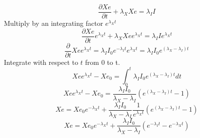 \documentclass[]{article}
\begin{document}
		\[
		\frac{\partial Xe}{\partial t}+ \lambda_X Xe = \lambda_I I 
		\]
		Multiply by an integrating factor $e^{\lambda_Xt}$
		\[
		\frac{\partial Xe}{\partial t}e^{\lambda_Xt} +\lambda_X Xe e^{\lambda_Xt}= \lambda_I I e^{\lambda_Xt} 
		\]
		\[
		\frac{\partial}{\partial t}Xe e^{\lambda_Xt}= \lambda_I I_0 e^{-\lambda_I t} e^{\lambda_Xt} = \lambda_I I_0 e^{(\lambda_X-\lambda_I )t} 
		\]
		Integrate with respect to $t$ from 0 to t. 
		\[
		Xe e^{\lambda_Xt}-Xe_0= \int_{0}^{t}\lambda_I I_0 e^{(\lambda_X-\lambda_I )t} dt
		\]
		\[
		Xe e^{\lambda_Xt}-Xe_0= \frac{\lambda_I I_0}{\lambda_X-\lambda_I} (e^{(\lambda_X-\lambda_I)t}-1)
		\]
		\[
		Xe =Xe_0 e^{-\lambda_Xt}+ \frac{\lambda_I I_0}{\lambda_X-\lambda_I} \frac{1}{e^{\lambda_Xt}}(e^{(\lambda_X-\lambda_I)t}-1)
		\]
		\[
		Xe =Xe_0 e^{-\lambda_Xt}+ \frac{\lambda_I I_0}{\lambda_X-\lambda_I}(e^{-\lambda_It}-e^{-\lambda_Xt})
		\]
		
\end{document}
